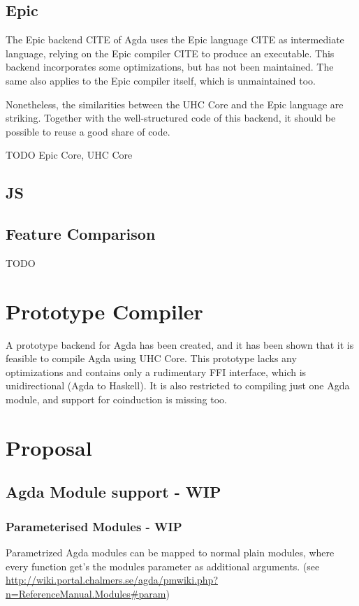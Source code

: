 \documentclass[12pt, a4paper, twoside]{report}
\begin{document}
\section{Epic}
The Epic backend CITE of Agda uses the Epic language CITE as intermediate language, relying on the Epic
compiler CITE to produce an executable. This backend incorporates some optimizations, but has not been
maintained. The same also applies to the Epic compiler itself, which is unmaintained too.

Nonetheless, the similarities between the UHC Core and the Epic language are striking. Together with
the well-structured code of this backend, it should be possible to reuse a good share of code.

TODO Epic Core, UHC Core

\section{JS}

\section{Feature Comparison}
TODO

\chapter{Prototype Compiler}
A prototype backend for Agda has been created, and it has been shown that it is feasible to compile
Agda using UHC Core. This prototype lacks any optimizations and contains only a rudimentary FFI
interface, which is unidirectional (Agda to Haskell). It is also restricted to compiling just one
Agda module, and support for coinduction is missing too.

\chapter{Proposal}
\section{Agda Module support - WIP}
\subsection{Parameterised Modules - WIP}
Parametrized Agda modules can be mapped to normal plain modules, where every function get's the
modules parameter as additional arguments. (see \url{http://wiki.portal.chalmers.se/agda/pmwiki.php?n=ReferenceManual.Modules#param})
\end{document}
